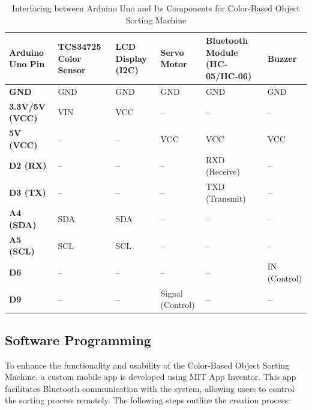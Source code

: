 \documentclass[conference, onecolumn]{IEEEtran}
\begin{document}
\begin{table}[htb]
    \caption{Interfacing between Arduino Uno and Its Components for Color-Based Object Sorting Machine}
    \label{tab:interfacing-components}
    \centering
    \begin{tabular}{|l|l|l|l|l|l|}
        \hline
        \textbf{Arduino Uno Pin} & \textbf{TCS34725 Color Sensor} & \textbf{LCD Display (I2C)} & \textbf{Servo Motor} & \textbf{Bluetooth Module (HC-05/HC-06)} & \textbf{Buzzer} \\ \hline
        \textbf{GND}         & GND                   & GND         & GND        & GND            & GND            \\ \hline
        \textbf{3.3V/5V (VCC)} & VIN                   & VCC         & --          & --             & --             \\ \hline
        \textbf{5V (VCC)}    & --                    & --          & VCC         & VCC            & VCC            \\ \hline
        \textbf{D2 (RX)}     & --                    & --          & --          & RXD (Receive)  & --             \\ \hline
        \textbf{D3 (TX)}     & --                    & --          & --          & TXD (Transmit) & --             \\ \hline
        \textbf{A4 (SDA)}    & SDA                   & SDA         & --          & --             & --             \\ \hline
        \textbf{A5 (SCL)}    & SCL                   & SCL         & --          & --             & --             \\ \hline
        \textbf{D6}          & --                    & --          & --          & --             & IN (Control)   \\ \hline
        \textbf{D9}          & --                    & --          & Signal (Control) & --             & --             \\ \hline
    \end{tabular}
\end{table}
\clearpage

\subsection{Software Programming}


To enhance the functionality and usability of the Color-Based Object Sorting Machine, a custom mobile app is developed using MIT App Inventor. This app facilitates Bluetooth communication with the system, allowing users to control the sorting process remotely. The following steps outline the creation process:
 \vspace{3em}
\end{document}
